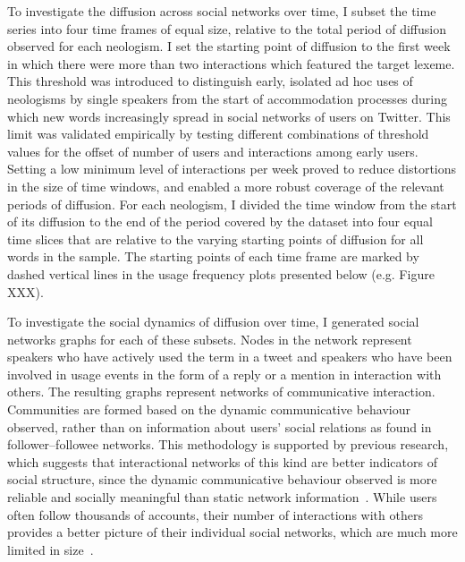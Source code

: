 \documentclass[
  a4paper,
  abstract=on,
  captions=tableabove,
  ]{scrartcl}
\begin{document}
  To investigate the diffusion across social networks over time, I subset the time series into four time frames of equal size, relative to the total period of diffusion observed for each neologism. I set the starting point of diffusion to the first week in which there were more than two interactions which featured the target lexeme. This threshold was introduced to distinguish early, isolated ad hoc uses of neologisms by single speakers from the start of accommodation processes during which new words increasingly spread in social networks of users on Twitter. This limit was validated empirically by testing different combinations of threshold values for the offset of number of users and interactions among early users. Setting a low minimum level of interactions per week proved to reduce distortions in the size of time windows, and enabled a more robust coverage of the relevant periods of diffusion. For each neologism, I divided the time window from the start of its diffusion to the end of the period covered by the dataset into four equal time slices that are relative to the varying starting points of diffusion for all words in the sample. The starting points of each time frame are marked by dashed vertical lines in the usage frequency plots presented below (e.g. Figure XXX).

  To investigate the social dynamics of diffusion over time, I generated social networks graphs for each of these subsets. Nodes in the network represent speakers who have actively used the term in a tweet and speakers who have been involved in usage events in the form of a reply or a mention in interaction with others. The resulting graphs represent networks of communicative interaction. Communities are formed based on the dynamic communicative behaviour observed, rather than on information about users' social relations as found in follower--followee networks. This methodology is supported by previous research, which suggests that interactional networks of this kind are better indicators of social structure, since the dynamic communicative behaviour observed is more reliable and socially meaningful than static network information~\parencite{Goel2016SocialDynamics, Huberman2008SocialNetworks}. While users often follow thousands of accounts, their number of interactions with others provides a better picture of their individual social networks, which are much more limited in size~\parencite{Dunbar1992NeocortexSize}.
\end{document}
